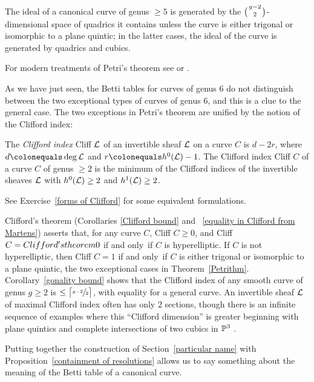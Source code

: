 \begin{theorem} [Petri]\label{Petrithm}
The ideal of a canonical curve of genus $\geq 5$ is generated by the
%
$\tbinom{g-2}{ 2}$-dimensional space of quadrics it contains unless the curve
is either trigonal or isomorphic to a plane quintic; in the latter cases,
the ideal of the curve is generated by quadrics and cubics.
\unif
\end{theorem}

For modern treatments of Petri's theorem see
\cite{Schreyer} or \cite{Arbarello-Sernesi}.

As we have just seen, the Betti tables for curves of genus 6
do not distinguish between the two exceptional types of 
curves of genus 6, and this is a clue to the general case.
The two exceptions in Petri's theorem are unified  by  the 
notion of the
%
Clifford index:

\begin{definition}
The \emph{Clifford index} Cliff $\sL$ of an invertible sheaf $\sL$ on a curve
%
$C$ is $d-2r$, where $d \colonequals  \deg \sL$ and $r \colonequals
h^0(\sL)-1$. The Clifford index Cliff $C$ of
a curve $C$ of genus $\geq 2$ is the minimum of the Clifford indices
of the invertible sheaves $\sL$  with $h^{0}(\sL) \geq 2$ and $h^{1}(\sL)\geq 2$.
\unif
\end{definition}
See Exercise~\ref{forms of Clifford} for some equivalent formulations.

Clifford's theorem (Corollaries \ref{Clifford bound} and ~\ref{equality
in Clifford from Martens}) asserts that, for any curve $C$,
 Cliff $C \geq 0$, and Cliff $C =
\index{Clifford's theorem}%
0$ if and only~if $C$ is hyperelliptic. If $C$ is not hyperelliptic, then
 Cliff $C=1$ if and only~if $C$ is either trigonal or
isomorphic to a plane quintic, the two exceptional cases in Theorem~\ref{Petrithm}.
Corollary~\ref{gonality bound} 
 shows
 that the Clifford index of any smooth curve of
genus $g\geq 2$ is $\leq \bigl\lceil \sfrac{\ssty g-2}{\ssty 2} \bigr\rceil$, 
with equality for a general
curve. An invertible sheaf $\sL$ of maximal Clifford index often has only
2 sections, though there is an infinite sequence of examples where this
``Clifford dimension'' is greater beginning with plane quintics
and complete intersections of two cubics in $\PP^{3}$ \cite{MR1030141}.

Putting together the construction of Section~\ref{particular name} with
Proposition~\ref{containment of resolutions} allows us to say
something about the meaning of the Betti table of a canonical curve.

